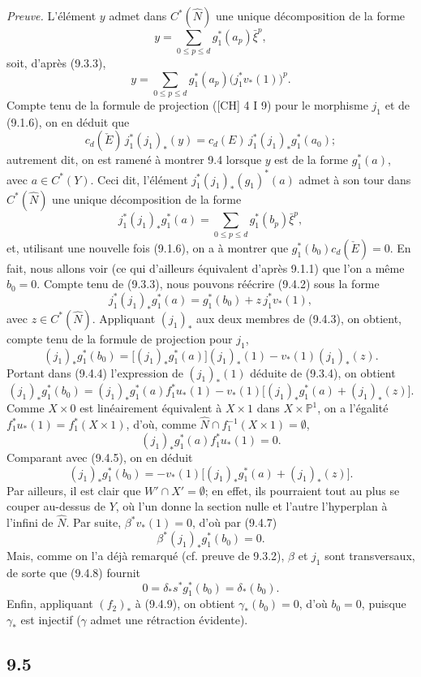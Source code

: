 \documentclass[11pt]{article}
\begin{document}
\emph{Preuve.} L'élément $y$ admet dans $C^*(\widehat N)$ une unique décomposition de la forme
\[
y=\sum_{0\le p\le d}g_1^*(a_p)\bar\xi^p,
\]
soit, d'après (9.3.3),
\[
y=\sum_{0\le p\le d}g_1^*(a_p)\bigl(j_1^*v_*(1)\bigr)^p.
\tag{9.4.1}
\]
Compte tenu de la formule de projection ([CH] 4 I 9) pour le morphisme $j_1$ et de (9.1.6), on en déduit que
\[
c_d(\check E)\,j_1^*(j_1)_*(y)=c_d(E)\,j_1^*(j_1)_*g_1^*(a_0);
\]
autrement dit, on est ramené à montrer 9.4 lorsque $y$ est de la forme $g_1^*(a)$, avec $a\in C^*(Y)$. Ceci dit, l'élément $j_1^*(j_1)_*(g_1)^*(a)$ admet à son tour dans $C^*(\widehat N)$ une unique décomposition de la forme
\[
j_1^*(j_1)_*g_1^*(a)=\sum_{0\le p\le d}g_1^*(b_p)\bar\xi^p,
\tag{9.4.2}
\]
et, utilisant une nouvelle fois (9.1.6), on a à montrer que $g_1^*(b_0)c_d(\check E)=0$. En fait, nous allons voir (ce qui d'ailleurs équivalent d'après 9.1.1) que l'on a même $b_0=0$. Compte tenu de (9.3.3), nous pouvons réécrire (9.4.2) sous la forme
\[
j_1^*(j_1)_*g_1^*(a)=g_1^*(b_0)+z\,j_1^*v_*(1),
\tag{9.4.3}
\]
avec $z\in C^*(\widehat N)$. Appliquant $(j_1)_*$ aux deux membres de (9.4.3), on obtient, compte tenu de la formule de projection pour $j_1$,
\[
(j_1)_*g_1^*(b_0)=\bigl[(j_1)_*g_1^*(a)\bigr](j_1)_*(1)-v_*(1)(j_1)_*(z).
\tag{9.4.4}
\]
Portant dans (9.4.4) l'expression de $(j_1)_*(1)$ déduite de (9.3.4), on obtient
\[
(j_1)_*g_1^*(b_0)=
(j_1)_*g_1^*(a)f_1^*u_*(1)-v_*(1)\bigl[(j_1)_*g_1^*(a)+(j_1)_*(z)\bigr].
\tag{9.4.5}
\]
Comme $X\times0$ est linéairement équivalent à $X\times1$ dans $X\times\mathbb P^1$, on a l'égalité $f_1^*u_*(1)=f_1^*(X\times1)$, d'où, comme $\widehat N\cap f_1^{-1}(X\times1)=\emptyset$,
\[
(j_1)_*g_1^*(a)f_1^*u_*(1)=0.
\tag{9.4.6}
\]
Comparant avec (9.4.5), on en déduit
\[
(j_1)_*g_1^*(b_0)=-v_*(1)\bigl[(j_1)_*g_1^*(a)+(j_1)_*(z)\bigr].
\tag{9.4.7}
\]
Par ailleurs, il est clair que $W'\cap X'=\emptyset$; en effet, ils pourraient tout au plus se couper au-dessus de $Y$, où l'un donne la section nulle et l'autre l'hyperplan à l'infini de $\widehat N$. Par suite, $\beta^*v_*(1)=0$, d'où par (9.4.7)
\[
\beta^*(j_1)_*g_1^*(b_0)=0.
\tag{9.4.8}
\]
Mais, comme on l'a déjà remarqué (cf. preuve de 9.3.2), $\beta$ et $j_1$ sont transversaux, de sorte que (9.4.8) fournit
\[
0=\delta_*s^*g_1^*(b_0)=\delta_*(b_0).
\tag{9.4.9}
\]
Enfin, appliquant $(f_2)_*$ à (9.4.9), on obtient $\gamma_*(b_0)=0$, d'où $b_0=0$, puisque $\gamma_*$ est injectif ($\gamma$ admet une rétraction évidente).

\subsection*{9.5}
\end{document}
